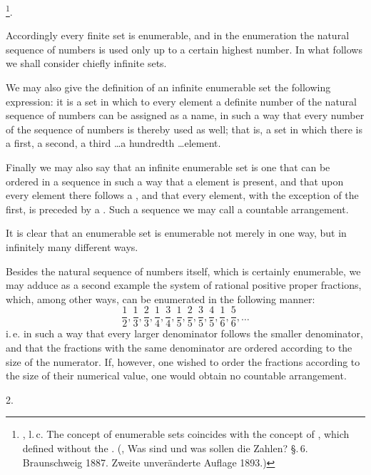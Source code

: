 \footnote{, l.\,c. The concept of enumerable sets coincides with the concept of , which  defined without the . (, Was sind und was sollen die Zahlen? \S.\,6. Braunschweig 1887. Zweite unveränderte Auflage 1893.)}.

Accordingly every finite set is enumerable, and in the enumeration the natural sequence of numbers is used only up to a certain highest number. In what follows we shall consider chiefly infinite sets.

We may also give the definition of an infinite enumerable set the following expression: it is a set in which to every element a definite number of the natural sequence of numbers can be assigned as a name, in such a way that every number of the sequence of numbers is thereby used as well; that is, a set in which there is a first, a second, a third \ldots a hundredth \ldots element.

Finally we may also say that an infinite enumerable set is one that can be ordered in a sequence in such a way that a  element is present, and that upon every element there follows a , and that every element, with the exception of the first, is preceded by a . Such a sequence we may call a countable arrangement.

It is clear that an enumerable set is enumerable not merely in one way, but in infinitely many different ways.

Besides the natural sequence of numbers itself, which is certainly enumerable, we may adduce as a second example the system of rational positive proper fractions, which, among other ways, can be enumerated in the following manner:
\[
\frac{1}{2}, \frac{1}{3}, \frac{2}{3}, \frac{1}{4}, \frac{3}{4}, \frac{1}{5}, \frac{2}{5}, \frac{3}{5}, \frac{4}{5}, \frac{1}{6}, \frac{5}{6}, \ldots
\]
i.\,e. in such a way that every larger denominator follows the smaller denominator, and that the fractions with the same denominator are ordered according to the size of the numerator. If, however, one wished to order the fractions according to the size of their numerical value, one would obtain no countable arrangement.

2. 
